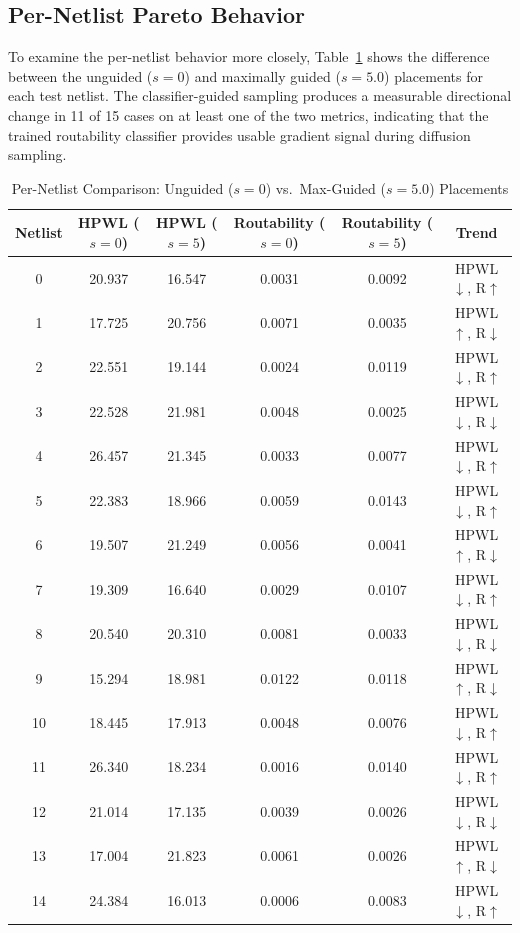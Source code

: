 \documentclass[lettersize,journal]{IEEEtran}
\begin{document}
\subsection{Per-Netlist Pareto Behavior}
\label{ssec:per_netlist}

To examine the per-netlist behavior more closely, Table~\ref{tab:per_netlist_extremes} shows the difference between the unguided ($s = 0$) and maximally guided ($s = 5.0$) placements for each test netlist. The classifier-guided sampling produces a measurable directional change in 11 of 15 cases on at least one of the two metrics, indicating that the trained routability classifier provides usable gradient signal during diffusion sampling.

\begin{table}[!t]
\caption{Per-Netlist Comparison: Unguided ($s{=}0$) vs.\ Max-Guided ($s{=}5.0$) Placements\label{tab:per_netlist_extremes}}
\centering
\begin{tabular}{|c|c|c|c|c|c|}
\hline
Netlist & HPWL ($s{=}0$) & HPWL ($s{=}5$) & Routability ($s{=}0$) & Routability ($s{=}5$) & Trend \\
\hline
0 & 20.937 & 16.547 & 0.0031 & 0.0092 & HPWL$\downarrow$, R$\uparrow$ \\
\hline
1 & 17.725 & 20.756 & 0.0071 & 0.0035 & HPWL$\uparrow$, R$\downarrow$ \\
\hline
2 & 22.551 & 19.144 & 0.0024 & 0.0119 & HPWL$\downarrow$, R$\uparrow$ \\
\hline
3 & 22.528 & 21.981 & 0.0048 & 0.0025 & HPWL$\downarrow$, R$\downarrow$ \\
\hline
4 & 26.457 & 21.345 & 0.0033 & 0.0077 & HPWL$\downarrow$, R$\uparrow$ \\
\hline
5 & 22.383 & 18.966 & 0.0059 & 0.0143 & HPWL$\downarrow$, R$\uparrow$ \\
\hline
6 & 19.507 & 21.249 & 0.0056 & 0.0041 & HPWL$\uparrow$, R$\downarrow$ \\
\hline
7 & 19.309 & 16.640 & 0.0029 & 0.0107 & HPWL$\downarrow$, R$\uparrow$ \\
\hline
8 & 20.540 & 20.310 & 0.0081 & 0.0033 & HPWL$\downarrow$, R$\downarrow$ \\
\hline
9 & 15.294 & 18.981 & 0.0122 & 0.0118 & HPWL$\uparrow$, R$\downarrow$ \\
\hline
10 & 18.445 & 17.913 & 0.0048 & 0.0076 & HPWL$\downarrow$, R$\uparrow$ \\
\hline
11 & 26.340 & 18.234 & 0.0016 & 0.0140 & HPWL$\downarrow$, R$\uparrow$ \\
\hline
12 & 21.014 & 17.135 & 0.0039 & 0.0026 & HPWL$\downarrow$, R$\downarrow$ \\
\hline
13 & 17.004 & 21.823 & 0.0061 & 0.0026 & HPWL$\uparrow$, R$\downarrow$ \\
\hline
14 & 24.384 & 16.013 & 0.0006 & 0.0083 & HPWL$\downarrow$, R$\uparrow$ \\
\hline
\end{tabular}
\end{table}
\end{document}
